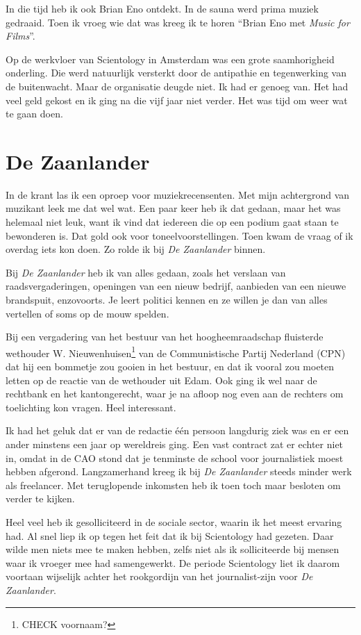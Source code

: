 \documentclass[10pt,twoside,openright]{memoir}
\begin{document}
In die tijd heb ik ook Brian Eno ontdekt. In de sauna werd prima muziek gedraaid. Toen ik vroeg wie dat was kreeg ik te horen ``Brian Eno met \emph{Music for Films}''.

Op de werkvloer van Scientology in Amsterdam was een grote saamhorigheid onderling. Die werd natuurlijk versterkt door de antipathie en tegenwerking van de buitenwacht. Maar de organisatie deugde niet. Ik had er genoeg van. Het had veel geld gekost en ik ging na die vijf jaar niet verder. Het was tijd om weer wat te gaan doen.

\chapter{De Zaanlander} %
\label{cha:zaanlander}

In de krant las ik een oproep voor muziekrecensenten. Met mijn achtergrond van muzikant leek me dat wel wat. Een paar keer heb ik dat gedaan, maar het was helemaal niet leuk, want ik vind dat iedereen die op een podium gaat staan te bewonderen is. Dat gold ook voor toneelvoorstellingen. Toen kwam de vraag of ik overdag iets kon doen. Zo rolde ik bij \emph{De Zaanlander} binnen. 

Bij \emph{De Zaanlander} heb ik van alles gedaan, zoals het verslaan van raadsvergaderingen, openingen van een nieuw bedrijf, aanbieden van een nieuwe brandspuit, enzovoorts. Je leert politici kennen en ze willen je dan van alles vertellen of soms op de mouw spelden. 

Bij een vergadering van het bestuur van het hoogheemraadschap fluisterde wethouder W. Nieuwenhuisen\footnote{CHECK voornaam?} van de Communistische Partij Nederland (CPN) dat hij een bommetje zou gooien in het bestuur, en dat ik vooral zou moeten letten op de reactie van de wethouder uit Edam. Ook ging ik wel naar de rechtbank en het kantongerecht, waar je na afloop nog even aan de rechters om toelichting kon vragen. Heel interessant. 

Ik had het geluk dat er van de redactie één persoon langdurig ziek was en er een ander minstens een jaar op wereldreis ging. Een vast contract zat er echter niet in, omdat in de CAO stond dat je tenminste de school voor journalistiek moest hebben afgerond. Langzamerhand kreeg ik bij \emph{De Zaanlander} steeds minder werk als freelancer. Met teruglopende inkomsten heb ik toen toch maar besloten om verder te kijken.

Heel veel heb ik gesolliciteerd in de sociale sector, waarin ik het meest ervaring had. Al snel liep ik op tegen het feit dat ik bij Scientology had gezeten. Daar wilde men niets mee te maken hebben, zelfs niet als ik solliciteerde bij mensen waar ik vroeger mee had samengewerkt. De periode Scientology liet ik daarom voortaan wijselijk achter het rookgordijn van het journalist-zijn voor \emph{De Zaanlander}.
\end{document}

